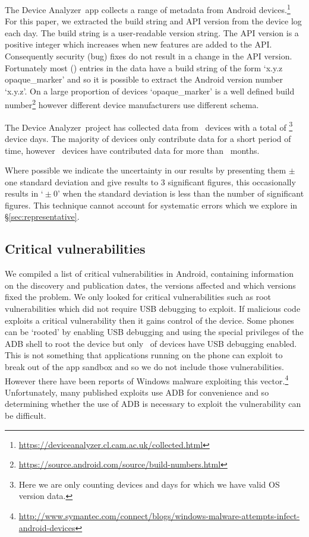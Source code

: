 \documentclass{llncs}
\newcommand{\da}{Device Analyzer}
\newcommand{\daNumDevices}{\daNumOSDevices}
\newcommand{\daDeviceDays}{\daOSTotalDaysData}
\begin{document}
The \da\ app collects a range of metadata from Android devices.\footnote{\url{https://deviceanalyzer.cl.cam.ac.uk/collected.html}}
For this paper, we extracted the build string and API version from the device log each day.
The build string is a user-readable version string.
The API version is a positive integer which increases when new features are added to the API.
Consequently security (bug) fixes do not result in a change in the API version.
Fortunately most (\daOSVersionPercValidLines) entries in the data have a build string of the form `x.y.z opaque\_marker' and so it is possible to extract the Android version number `x.y.z'.
On a large proportion of devices `opaque\_marker' is a well defined build number\footnote{\url{https://source.android.com/source/build-numbers.html}} however different device manufacturers use different schema.

The \da\ project has collected data from \daNumDevices\ devices with a total of \daDeviceDays\footnote{Here we are only counting devices and days for which we have valid OS version data.} device days.
The majority of devices only contribute data for a short period of time, however \daMonthsDevices\ devices have contributed data for more than \daMonths~months.

Where possible we indicate the uncertainty in our results by presenting them $\pm$ one standard deviation and give results to 3 significant figures, this occasionally results in `${} \pm 0$' when the standard deviation is less than the number of significant figures.
This technique cannot account for systematic errors which we explore in \S\ref{sec:representative}.



\subsection{Critical vulnerabilities}
We compiled a list of critical vulnerabilities in Android, containing information on the discovery and publication dates, the versions affected and which versions fixed the problem.
We only looked for critical vulnerabilities such as root vulnerabilities which did not require USB debugging to exploit.
If malicious code exploits a critical vulnerability then it gains control of the device.
Some phones can be `rooted' by enabling USB debugging and using the special privileges of the ADB shell to root the device but only \daAdbEnabledPerc\ of devices have USB debugging enabled.
This is not something that applications running on the phone can exploit to break out of the app sandbox and so we do not include those vulnerabilities.
However there have been reports of Windows malware exploiting this vector.\footnote{\url{http://www.symantec.com/connect/blogs/windows-malware-attempts-infect-android-devices}}
Unfortunately, many published exploits use ADB for convenience and so determining whether the use of ADB is necessary to exploit the vulnerability can be difficult.
\end{document}
